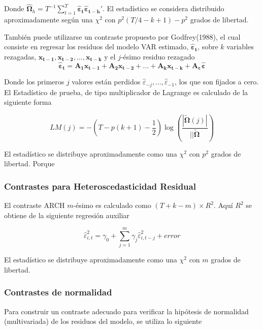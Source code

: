 \documentclass[12pt, twoside]{book}\usepackage[]{graphicx}\usepackage[]{color}
\numberwithin{equation}{section}
\numberwithin{theorem}{section}
\numberwithin{teorema}{section}
\numberwithin{defi}{section}
\numberwithin{prop}{section}
\numberwithin{defi}{section}
\theoremstyle{plain}
\begin{document}
Donde  $ \boldsymbol{\hat{\Omega}}_{h} = T^{-1}\sum_{t=1}^{T}\boldsymbol{\hat{\varepsilon}_{t}\hat{\varepsilon}_{t-h}'}$. El estadístico se considera distribuido aproximadamente según una $\chi^{2}$ con $p^{2}(T/4-k+1)-p^{2}$ grados de libertad. 

También puede utilizarse un contraste propuesto por Godfrey(1988),  el cual consiste en regresar los residuos del modelo VAR estimado, $\boldsymbol{\hat{\varepsilon}_{t}}$, sobre $k$ variables rezagadas, $\mathbf{x_{t-1}, x_{t-2}, ...,x_{t-k}}$ y el $j$-ésimo residuo rezagado
\begin{equation}
\boldsymbol{\hat{\varepsilon}_{t}}=\mathbf{A_{1}x_{t-1}+A_{2}x_{t-2}+...+A_{k}x_{t-k}+A_{\varepsilon}}\boldsymbol{\hat{\varepsilon}}
\end{equation}

Donde los primeros $j$ valores están perdidos $\hat{\varepsilon}_{-j},...,\hat{\varepsilon}_{-1}$, los que son fijados a cero. El Estadístico de prueba, de tipo multiplicador de Lagrange es calculado de la siguiente forma 

\begin{equation}
LM(j) = -(T-p(k+1)-\frac{1}{2})\log \left(\frac{|\boldsymbol{\tilde{\Omega}}(j)|}{||\boldsymbol{\tilde{\Omega}}}\right)
\end{equation}

El estadístico se distribuye aproximadamente como una $\chi^{2}$ con $p^{2}$ grados de libertad. Porque 

\subsubsection{Contrastes para Heteroscedasticidad Residual}

El contraste ARCH $m$-ésimo es calculado como $(T+k-m)\times R^{2}$. Aquí $R^{2}$ se obtiene de la siguiente regresión auxiliar

\begin{equation}
\hat{\varepsilon}^{2}_{i,t} = \gamma_{0}+\sum_{j=1}^{m}\gamma_{j}\hat{\varepsilon}_{i,t-j}^{2}+error
\end{equation}

El estadístico se distribuye aproximadamente como una $\chi^{2}$ con $m$ grados de libertad. 

\subsubsection{Contrastes de normalidad}

Para construir un contraste adecuado para verificar la hipótesis de normalidad (multivariada) de los residuos del modelo, se utiliza lo siguiente
\end{document}
